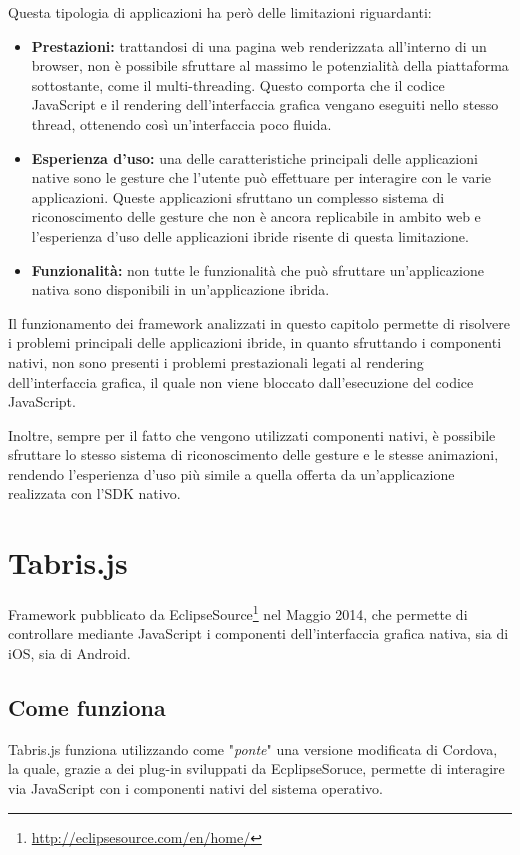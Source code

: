 Questa tipologia di applicazioni ha però delle limitazioni riguardanti:
\begin{itemize}
\item \textbf{Prestazioni:} trattandosi di una pagina web renderizzata all'interno di un browser, non è possibile sfruttare al massimo le potenzialità della piattaforma sottostante, come il multi-threading. Questo comporta che il codice JavaScript e il rendering dell'interfaccia grafica vengano eseguiti nello stesso thread, ottenendo così un'interfaccia poco fluida.
\item \textbf{Esperienza d'uso:} una delle caratteristiche principali delle applicazioni native sono le \gls{gesture} che l'utente può effettuare per interagire con le varie applicazioni. Queste applicazioni sfruttano un complesso sistema di riconoscimento delle gesture che non è ancora replicabile in ambito web e l'esperienza d'uso delle applicazioni ibride risente di questa limitazione.
\item \textbf{Funzionalità:} non tutte le funzionalità che può sfruttare un'applicazione nativa sono disponibili in un'applicazione ibrida.
\end{itemize}
Il funzionamento dei framework analizzati in questo capitolo permette di risolvere i problemi principali delle applicazioni ibride, in quanto sfruttando i componenti nativi, non sono presenti i problemi prestazionali legati al rendering dell'interfaccia grafica, il quale non viene bloccato dall'esecuzione del codice JavaScript.

Inoltre, sempre per il fatto che  vengono utilizzati componenti nativi, è possibile sfruttare lo stesso sistema di riconoscimento delle gesture e le stesse animazioni, rendendo l'esperienza d'uso più simile a quella offerta da un'applicazione realizzata con l'SDK nativo.

\section{Tabris.js}

Framework pubblicato da EclipseSource\footnote{\url{http://eclipsesource.com/en/home/}} nel Maggio 2014, che permette di controllare mediante JavaScript i componenti dell'interfaccia grafica nativa, sia di iOS, sia di Android.

\subsection{Come funziona}
Tabris.js funziona utilizzando come "\textit{ponte}" una versione modificata di Cordova, la quale, grazie a dei plug-in sviluppati da EcplipseSoruce, permette di interagire via JavaScript con i componenti nativi del sistema operativo.


